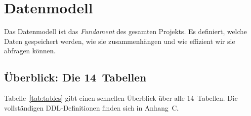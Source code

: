 
\chapter{Datenmodell}

\label{ch:datenmodell}

Das Datenmodell ist das \emph{Fundament} des gesamten Projekts.
Es definiert, welche Daten gespeichert werden, wie sie
zusammenhängen und wie effizient wir sie abfragen können.

\section{Überblick: Die 14~Tabellen}

Tabelle~\ref{tab:tables} gibt einen schnellen Überblick über alle
14~Tabellen. Die vollständigen DDL-Definitionen finden sich in
Anhang~C.

